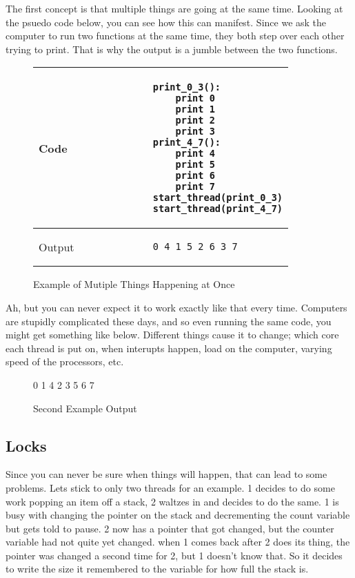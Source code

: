 \documentclass[12pt]{article}
\begin{document}
The first concept is that multiple things are going at the same time.
Looking at the psuedo code below, you can see how this can manifest.
Since we ask the computer to run two functions at the same time, they both step over each other trying to print.
That is why the output is a jumble between the two functions.

\begin{figure}[htb]
	\centering
	\begin{tabular}{l|l}
		\hline Code &
		\begin{minipage}[t]{0.4\textwidth}
		\begin{verbatim}
			print_0_3():
				print 0
				print 1
				print 2
				print 3
			print_4_7():
				print 4
				print 5
				print 6
				print 7
			start_thread(print_0_3)
			start_thread(print_4_7)
		\end{verbatim}
		\end{minipage}
		\\ \hline
		Output &
		\begin{minipage}[t]{0.4\textwidth}
		\begin{verbatim}
			0 4 1 5 2 6 3 7
		\end{verbatim}
		\end{minipage}
		\\ \hline
	\end{tabular}
	\caption{Example of Mutiple Things Happening at Once}
\end{figure}

\newpage
Ah, but you can never expect it to work exactly like that every time.
Computers are stupidly complicated these days, and so even running the same code, you might get something like below.
Different things cause it to change; which core each thread is put on, when interupts happen, load on the computer, varying speed of the processors, etc.

\begin{figure}[htb]
	\centering
		0 1 4 2 3 5 6 7
	\caption{Second Example Output}
\end{figure}

\subsection{Locks}

Since you can never be sure when things will happen, that can lead to some problems.
Lets stick to only two threads for an example.
1 decides to do some work popping an item off a stack, 2 waltzes in and decides to do the same.
1 is busy with changing the pointer on the stack and decrementing the count variable but gets told to pause.
2 now has a pointer that got changed, but the counter variable had not quite yet changed.
when 1 comes back after 2 does its thing, the pointer was changed a second time for 2, but 1 doesn't know that.
So it decides to write the size it remembered to the variable for how full the stack is.
\end{document}

